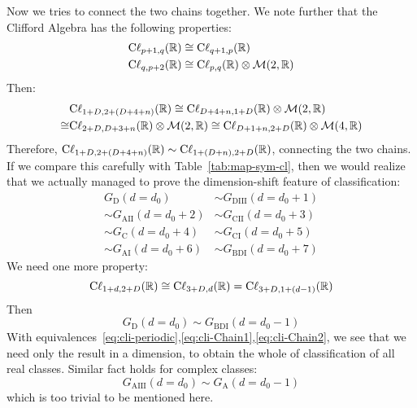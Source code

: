 Now we tries to connect the two chains together. We note further that the
Clifford Algebra has the following properties:
\begin{align}
    \mathrm{C\ell}_{p+1,q}(\mathbb{R}) &\cong \mathrm{C\ell}_{q+1,p}(\mathbb{R}) \\
    \mathrm{C\ell}_{q,p+2}(\mathbb{R}) &\cong \mathrm{C\ell}_{p,q}(\mathbb{R}) \otimes\mathcal{M}(2,\mathbb{R})
\end{align}
Then:
\begin{align}
    &\mathrm{C\ell}_{1+D,2+(D+4+n)}(\mathbb{R}) \cong
    \mathrm{C\ell}_{D+4+n,1+D}(\mathbb{R})\otimes\mathcal{M}(2,\mathbb{R}) \nonumber\\
    \cong& \mathrm{C\ell}_{2+D,D+3+n}(\mathbb{R})\otimes\mathcal{M}(2,\mathbb{R})
    \cong \mathrm{C\ell}_{D+1+n,2+D}(\mathbb{R})\otimes\mathcal{M}(4,\mathbb{R})
\end{align}
Therefore,
$\mathrm{C\ell}_{1+D,2+(D+4+n)}(\mathbb{R})\sim\mathrm{C\ell}_{1+(D+n),2+D}(\mathbb{R})$,
connecting the two chains. If we compare this carefully with
Table~\ref{tab:map-sym-cl}, then we would realize that we actually managed to
prove the dimension-shift feature of classification:
\begin{align}
    \label{eq:cli-Chain1}
    G_{\mathrm{D}}(d=d_0) &\sim G_{\mathrm{DIII}}(d=d_0+1) \nonumber\\
    \sim G_{\mathrm{AII}}(d=d_0+2) &\sim G_{\mathrm{CII}}(d=d_0+3) \nonumber\\
    \sim G_{\mathrm{C}}(d=d_0+4) &\sim G_{\mathrm{CI}}(d=d_0+5) \nonumber\\
    \sim G_{\mathrm{AI}}(d=d_0+6) &\sim G_{\mathrm{BDI}}(d=d_0+7)
\end{align}
We need one more property:
\begin{equation}
    \mathrm{C\ell}_{1+d,2+D}(\mathbb{R})\cong
    \mathrm{C\ell}_{3+D,d}(\mathbb{R})=\mathrm{C\ell}_{3+D,1+(d-1)}(\mathbb{R})
\end{equation}
Then
\begin{equation}
    \label{eq:cli-Chain2}
    G_{\mathrm{D}}(d=d_0) \sim G_{\mathrm{BDI}}(d=d_0-1)
\end{equation}
With equivalences~\ref{eq:cli-periodic},\ref{eq:cli-Chain1},\ref{eq:cli-Chain2},
we see that we need only the result in a dimension, to obtain the whole of
classification of all real classes. Similar fact holds for complex classes:
\begin{equation}
    G_{\mathrm{AIII}}(d=d_0) \sim G_{\mathrm{A}}(d=d_0-1)
\end{equation}
which is too trivial to be mentioned here. 

